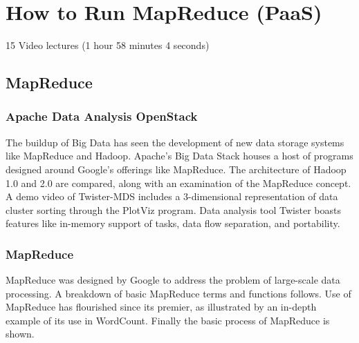 \part{How to Run MapReduce (PaaS)}
\label{sec:icloud-mapreduce}


  15 Video lectures (1 hour 58 minutes 4 seconds)

\chapter{MapReduce}

\section{Apache Data Analysis OpenStack}

The buildup of Big Data has seen the development of new data storage
systems like MapReduce and Hadoop. Apache's Big Data Stack houses a host
of programs designed around Google's offerings like MapReduce. The
architecture of Hadoop 1.0 and 2.0 are compared, along with an
examination of the MapReduce concept. A demo video of Twister-MDS
includes a 3-dimensional representation of data cluster sorting through
the PlotViz program. Data analysis tool Twister boasts features like
in-memory support of tasks, data flow separation, and portability.



\section{MapReduce}

MapReduce was designed by Google to address the problem of large-scale
data processing. A breakdown of basic MapReduce terms and functions
follows. Use of MapReduce has flourished since its premier, as
illustrated by an in-depth example of its use in WordCount. Finally the
basic process of MapReduce is shown.



